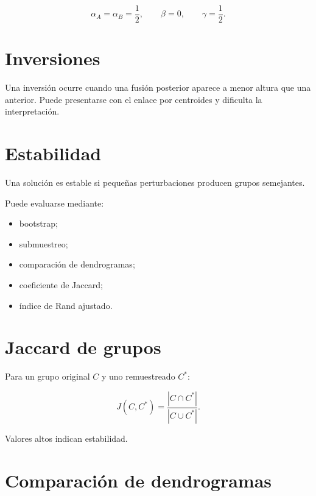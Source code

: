 \documentclass[
  spanish,
  10.5pt,
  letterpaper,
  DIV=11,
  numbers=noendperiod,
  oneside,
  open=any]{scrreprt}
\providecommand{\tightlist}{%
  \setlength{\itemsep}{0pt}\setlength{\parskip}{0pt}}
\theoremstyle{definition}
\theoremstyle{definition}
\theoremstyle{plain}
\theoremstyle{remark}
\begin{document}
\[
\alpha_A=\alpha_B=\frac{1}{2},
\qquad
\beta=0,
\qquad
\gamma=\frac{1}{2}.
\]

\section*{Inversiones}\label{inversiones}


Una inversión ocurre cuando una fusión posterior aparece a menor altura
que una anterior. Puede presentarse con el enlace por centroides y
dificulta la interpretación.

\section*{Estabilidad}\label{estabilidad}


Una solución es estable si pequeñas perturbaciones producen grupos
semejantes.

Puede evaluarse mediante:

\begin{itemize}
\tightlist
\item
  bootstrap;
\item
  submuestreo;
\item
  comparación de dendrogramas;
\item
  coeficiente de Jaccard;
\item
  índice de Rand ajustado.
\end{itemize}

\section*{Jaccard de grupos}\label{jaccard-de-grupos}


Para un grupo original \(C\) y uno remuestreado \(C^*\):

\[
J(C,C^*)
=
\frac{|C\cap C^*|}{|C\cup C^*|}.
\]

Valores altos indican estabilidad.

\section*{Comparación de
dendrogramas}\label{comparaciuxf3n-de-dendrogramas}
\end{document}
